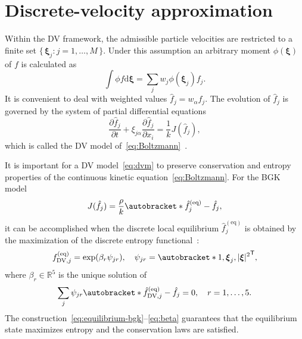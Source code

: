 \documentclass[]{elsarticle} %
\newcommand{\dd}{\mathrm{d}}
\newcommand{\pder}[2][]{\frac{\partial#1}{\partial#2}}
\newcommand{\Set}[2]{\{\,{#1}:{#2}\,\}}
\newcommand{\transpose}[1]{#1^\mathsf{T}}
\DeclarePairedDelimiter\autobracket()       %
\newcommand{\br}[1]{\autobracket*{#1}}
\newcommand{\dxi}{\dd{\boldsymbol{\xi}}}
\newcommand{\bxi}{\boldsymbol{\xi}}
\newcommand{\equil}[1]{#1^\mathrm{(eq)}}
\newcommand{\DV}{\mathrm{DV}}
\newcommand{\xiai}{\xi_{j \alpha}}
\begin{document}
\section{Discrete-velocity approximation}\label{sec:dv}

Within the DV framework, the admissible particle velocities are restricted to a finite set \(\Set{\bxi_j}{j=1,\dots,M}\).
Under this assumption an arbitrary moment \(\phi(\bxi)\) of \(f\) is calculated as
\begin{equation}\label{eq:cubature}
    \int \phi f\dxi = \sum_j w_j \phi(\bxi_j) f_j.
\end{equation}
It is convenient to deal with weighted values \(\hat{f}_j = w_\alpha f_j\).
The evolution of \(\hat{f}_j\) is governed by the system of partial differential equations
\begin{equation}\label{eq:dvm}
    \pder[\hat{f}_j]{t} + \xiai\pder[\hat{f}_j]{x_i} = \frac1kJ(\hat{f}_j),
\end{equation}
which is called the DV model of~\eqref{eq:Boltzmann}~\cite{Cabannes1980}.

It is important for a DV model~\eqref{eq:dvm} to preserve conservation and entropy properties
of the continuous kinetic equation~\eqref{eq:Boltzmann}.
For the BGK model
\begin{equation}\label{eq:dvm-bgk}
    J(\hat{f}_j) = \frac{\rho}{k} \br{\equil{\hat{f}}_j-\hat{f}_j},
\end{equation}
it can be accomplished when the discrete local equilibrium \(\equil{\hat{f}}_j\)
is obtained by the maximization of the discrete entropy functional~\cite{Mieussens2000}:
\begin{equation}\label{eq:equilibrium-bgk}
    \equil{f}_{\DV,j} = \exp(\beta_r\psi_{jr}), \quad \psi_{jr} = \transpose{\br{1,\bxi_j,|\bxi|^2}},
\end{equation}
where \(\beta_r\in\mathbb{R}^5\) is the unique solution of
\begin{equation}\label{eq:beta}
    \sum_j\psi_{jr}\br{\equil{\hat{f}}_{\DV,j} - \hat{f}_j} = 0, \quad r = 1,\dots,5.
\end{equation}
The construction~\eqref{eq:equilibrium-bgk}--\eqref{eq:beta} guarantees that
the equilibrium state maximizes entropy and the conservation laws are satisfied.

\end{document}

